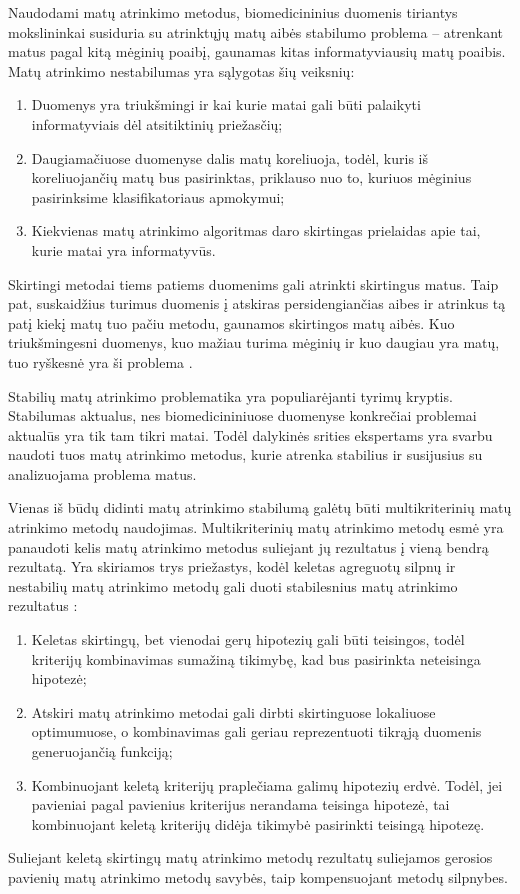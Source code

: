 Naudodami matų atrinkimo metodus, biomedicininius duomenis tiriantys mokslininkai susiduria su atrinktųjų matų aibės stabilumo problema -- atrenkant matus pagal kitą mėginių poaibį, gaunamas kitas informatyviausių matų poaibis. Matų atrinkimo nestabilumas yra sąlygotas šių veiksnių:
\begin{enumerate}
 \item Duomenys yra triukšmingi ir kai kurie matai gali būti palaikyti informatyviais dėl atsitiktinių priežasčių;
 \item Daugiamačiuose duomenyse dalis matų koreliuoja, todėl, kuris iš koreliuojančių matų bus pasirinktas, priklauso nuo to, kuriuos mėginius pasirinksime klasifikatoriaus apmokymui;
 \item Kiekvienas matų atrinkimo algoritmas daro skirtingas prielaidas apie tai, kurie matai yra informatyvūs.
\end{enumerate}
Skirtingi metodai tiems patiems duomenims gali atrinkti skirtingus matus. Taip pat, suskaidžius turimus duomenis į atskiras persidengiančias aibes ir atrinkus tą patį kiekį matų tuo pačiu metodu, gaunamos skirtingos matų aibės. Kuo triukšmingesni duomenys, kuo mažiau turima mėginių ir kuo daugiau yra matų, tuo ryškesnė yra ši problema \cite{loscalzo2009consensus}. 

Stabilių matų atrinkimo problematika yra populiarėjanti tyrimų kryptis. Stabilumas aktualus, nes biomedicininiuose duomenyse konkrečiai problemai aktualūs yra tik tam tikri matai. Todėl dalykinės srities ekspertams yra svarbu naudoti tuos matų atrinkimo metodus, kurie atrenka stabilius ir susijusius su analizuojama problema matus. 

Vienas iš būdų didinti matų atrinkimo stabilumą galėtų būti multikriterinių matų atrinkimo metodų naudojimas. Multikriterinių matų atrinkimo metodų esmė yra panaudoti kelis matų atrinkimo metodus suliejant jų rezultatus į vieną bendrą rezultatą. Yra skiriamos trys priežastys, kodėl keletas agreguotų silpnų ir nestabilių matų atrinkimo metodų gali duoti stabilesnius matų atrinkimo rezultatus \cite{dietterich2000ensemble}:
\begin{enumerate}
 \item Keletas skirtingų, bet vienodai gerų hipotezių gali būti teisingos, todėl kriterijų kombinavimas sumažiną tikimybę, kad bus pasirinkta neteisinga hipotezė;
 \item Atskiri matų atrinkimo metodai gali dirbti skirtinguose lokaliuose optimumuose, o kombinavimas gali geriau reprezentuoti tikrąją duomenis generuojančią funkciją;
 \item Kombinuojant keletą kriterijų praplečiama galimų hipotezių erdvė. Todėl, jei pavieniai pagal pavienius kriterijus nerandama teisinga hipotezė, tai kombinuojant keletą kriterijų didėja tikimybė pasirinkti teisingą hipotezę.
\end{enumerate}
Suliejant keletą skirtingų matų atrinkimo metodų rezultatų suliejamos gerosios pavienių matų atrinkimo metodų savybės, taip kompensuojant metodų silpnybes.

